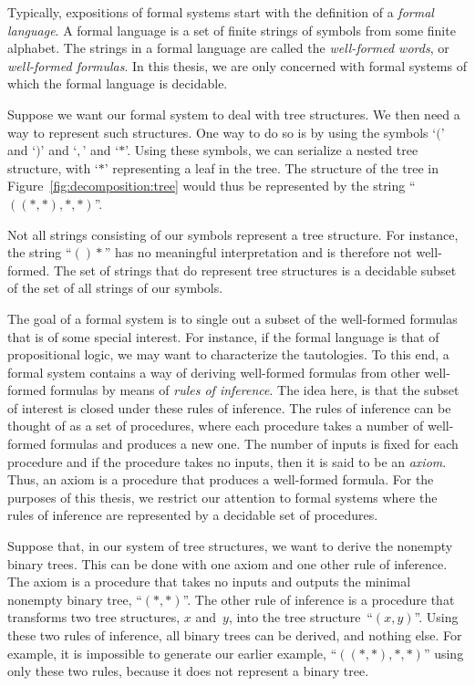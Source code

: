 Typically, expositions of formal systems start with the definition of a \emph{formal language}.
A formal language is a set of finite strings of symbols from some finite alphabet.
The strings in a formal language are called the \emph{well-formed words}, or \emph{well-formed formulas}.
In this thesis, we are only concerned with formal systems of which the formal language is decidable.
\begin{example}
  Suppose we want our formal system to deal with tree structures.
  We then need a way to represent such structures.
  One way to do so is by using the symbols `$($' and `$)$' and `$,$' and `$\ast$'.
  Using these symbols, we can serialize a nested tree structure, with `$\ast$' representing a leaf in the tree.
  The structure of the tree in Figure~\ref{fig:decomposition:tree} would thus be represented by the string \enquote{$((\ast, \ast), \ast, \ast)$}.

  Not all strings consisting of our symbols represent a tree structure.
  For instance, the string \enquote{$()\ast$} has no meaningful interpretation and is therefore not well-formed.
  The set of strings that do represent tree structures is a decidable subset of the set of all strings of our symbols.
\end{example}

The goal of a formal system is to single out a subset of the well-formed formulas that is of some special interest.
For instance, if the formal language is that of propositional logic, we may want to characterize the tautologies.
To this end, a formal system contains a way of deriving well-formed formulas from other well-formed formulas by means of \emph{rules of inference}.
The idea here, is that the subset of interest is closed under these rules of inference.
The rules of inference can be thought of as a set of procedures, where each procedure takes a number of well-formed formulas and produces a new one.
The number of inputs is fixed for each procedure and if the procedure takes no inputs, then it is said to be an \emph{axiom}.
Thus, an axiom is a procedure that produces a well-formed formula.
For the purposes of this thesis, we restrict our attention to formal systems where the rules of inference are represented by a decidable set of procedures.
\begin{example}[continued]
  Suppose that, in our system of tree structures, we want to derive the nonempty binary trees.
  This can be done with one axiom and one other rule of inference.
  The axiom is a procedure that takes no inputs and outputs the minimal nonempty binary tree, \enquote{$(\ast, \ast)$}.
  The other rule of inference is a procedure that transforms two tree structures, $x$ and~$y$, into the tree structure~\enquote{$(x, y)$}.
  Using these two rules of inference, all binary trees can be derived, and nothing else.
  For example, it is impossible to generate our earlier example, \enquote{$((\ast, \ast), \ast, \ast)$} using only these two rules, because it does not represent a binary tree.
\end{example}

